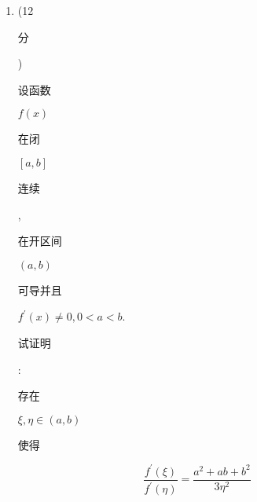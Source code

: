 \documentclass[10pt]{article}
\begin{document}
\begin{enumerate}
  \item (12 \begin{CJK}{UTF8}{mj}分\end{CJK}) \begin{CJK}{UTF8}{mj}设函数\end{CJK} $f(x)$ \begin{CJK}{UTF8}{mj}在闭\end{CJK} $[a, b]$ \begin{CJK}{UTF8}{mj}连续\end{CJK}, \begin{CJK}{UTF8}{mj}在开区间\end{CJK} $(a, b)$ \begin{CJK}{UTF8}{mj}可导并且\end{CJK} $f^{\prime}(x) \neq 0,0<a<b$. \begin{CJK}{UTF8}{mj}试证明\end{CJK}: \begin{CJK}{UTF8}{mj}存在\end{CJK} $\xi, \eta \in(a, b)$ \begin{CJK}{UTF8}{mj}使得\end{CJK}

\end{enumerate}
$$
\frac{f^{\prime}(\xi)}{f^{\prime}(\eta)}=\frac{a^{2}+a b+b^{2}}{3 \eta^{2}}
$$
\end{document}
